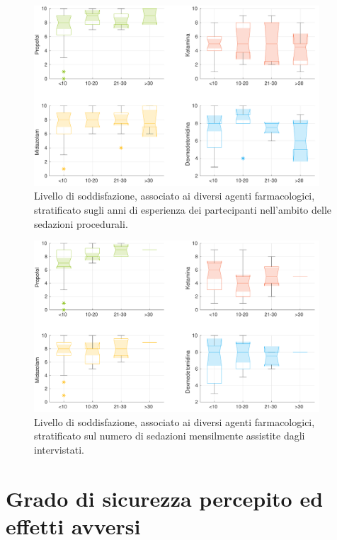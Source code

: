 \vfill
\begin{figure}[ht]
    \centering
    \includegraphics[width=0.95\textwidth]{Figure/qualita-strat-esperienza.pdf}
    \caption{Livello di soddisfazione, associato ai diversi agenti farmacologici, stratificato sugli anni di esperienza dei partecipanti nell'ambito delle sedazioni procedurali.} %
    \label{fig:qualitaesperienza}
\end{figure}

\vfill
\begin{figure}[!h]
    \centering
    \includegraphics[width=0.95\textwidth]{Figure/qualita-strat-frequenza.pdf}
    \caption{Livello di soddisfazione, associato ai diversi agenti farmacologici, stratificato sul numero di sedazioni mensilmente assistite dagli intervistati.} %
    \label{fig:qualitafrequenza}
\end{figure}

\vfill
\newpage

\vfill
\section{Grado di sicurezza percepito ed effetti avversi}

